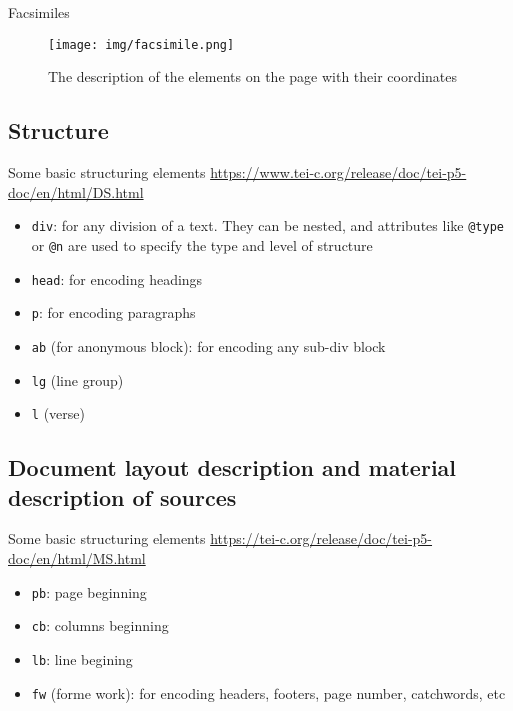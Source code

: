\documentclass[11pt,aspectratio=1610]{beamer}
\begin{document}
\begin{frame}{Facsimiles}
\begin{center}
\begin{figure}
\texttt{[image: img/facsimile.png]}
\caption{The description of the elements on the page with their coordinates}
\end{figure}
\end{center}
\end{frame}


\subsection{Structure}
\begin{frame}{Some basic structuring elements}
\url{https://www.tei-c.org/release/doc/tei-p5-doc/en/html/DS.html}
\begin{itemize}
\item \texttt{div}: for any division of a text. They can be nested, and attributes like \texttt{@type} or \texttt{@n} are used to specify the type and level of structure
\item \texttt{head}: for encoding headings
\item \texttt{p}: for encoding paragraphs
\item \texttt{ab} (for anonymous block): for encoding any sub-div block
\item \texttt{lg} (line group)
\item \texttt{l} (verse)
\end{itemize}
\end{frame}


\subsection{Document layout description and material description of sources}
\begin{frame}{Some basic structuring elements}
\url{https://tei-c.org/release/doc/tei-p5-doc/en/html/MS.html}
\begin{itemize}
\item \texttt{pb}: page beginning
\item \texttt{cb}: columns beginning
\item \texttt{lb}: line begining
\item \texttt{fw} (forme work): for encoding headers, footers, page number, catchwords, etc
\end{itemize}
\end{frame}
\end{document}
